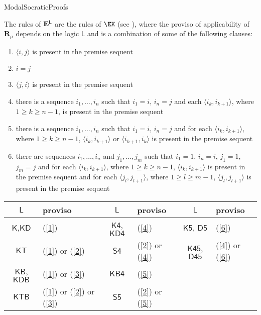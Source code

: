 \begin{entry}{ModalSocraticProofs}  

\begin{calculus}

The rules of $\mathbf{E}^\mathsf{L}$ are the rules of $\EK$ (see ), where the proviso of applicability of $\mathbf{R}_\mu$ depends on the logic $\mathsf{L}$ and is a combination of some of the following clauses:

\begin{enumerate}
\item\label{1} $\langle i, j \rangle$ is present in the premise sequent
\item\label{2} $i = j$
\item\label{3} $\langle j, i \rangle$ is present in the premise sequent
\item\label{4} there is a sequence $i_1, \ldots, i_n$ such that $i_1 = i$, $i_n = j$ and each $\langle i_k, i_{k+1} \rangle$, where $1 \geq k \geq n-1$, is present in the premise sequent
\item\label{5} there is a sequence $i_1, \ldots, i_n$ such that $i_1 = i$, $i_n = j$ and for each $\langle i_k, i_{k+1} \rangle$, where $1 \geq k \geq n-1$, $\langle i_k, i_{k+1} \rangle$ or $\langle i_{k+1}, i_{k} \rangle$ is present in the premise sequent
\item\label{6} there are sequences $i_1, \ldots, i_n$ and $j_1, \ldots, j_m$ such that $i_1 = 1$, $i_n = i$, $j_1 = 1$, $j_m = j$ and for each $\langle i_k, i_{k+1} \rangle$, where $1 \geq k \geq n-1$, $\langle i_k, i_{k+1} \rangle$ is present in the premise sequent and for each $\langle j_l, j_{l+1} \rangle$, where $1 \geq l \geq m-1$, $\langle j_l, j_{l+1} \rangle$ is present in the premise sequent
\end{enumerate}

\smallskip


\begin{center}
\begin{tabular}{c|l||c|l||c|l}
$\mathsf{L}$ 				& proviso & $\mathsf{L}$ 		& proviso & $\mathsf{L}$ 		& proviso \\
\hline
$\mathsf{K}$,$\mathsf{KD}$	& (\ref{1}) & $\mathsf{K4}$, $\mathsf{KD4}$ & (\ref{4}) & $\mathsf{K5}$, $\mathsf{D5}$ & (\ref{6}) \\
$\mathsf{KT}$				& (\ref{1}) or (\ref{2}) & $\mathsf{S4}$		& (\ref{2}) or (\ref{4}) & $\mathsf{K45}$, $\mathsf{D45}$ & (\ref{4}) or (\ref{6}) \\
$\mathsf{KB}$, $\mathsf{KDB}$ & (\ref{1}) or (\ref{3}) & $\mathsf{KB4}$	& (\ref{5}) && \\
$\mathsf{KTB}$				& (\ref{1}) or (\ref{2}) or (\ref{3}) & $\mathsf{S5}$	& (\ref{2}) or (\ref{5})
\end{tabular}
\end{center}


\end{calculus}
\end{entry}

